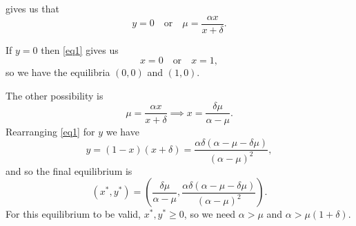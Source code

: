 \documentclass[a4paper, 12pt]{article}
\begin{document}
\begin{enumerate}[label={\bf \arabic{*}.\;}, ref={\arabic{*}},itemsep=3ex, left=0ex]
{\begin{enumerate}[label=(\alph*)]
           gives us that
          \begin{equation}
            y = 0 \quad \text{or} \quad \mu = \frac{\alpha x}{x + \delta}.
          \end{equation}

          If $y=0$ then \cref{eq1} gives us
          \begin{equation}
            x = 0 \quad \text{or} \quad x = 1,
          \end{equation}
          so we have the equilibria $(0,0)$ and $(1,0)$.

          The other possibility is
          \begin{equation}
            \mu = \frac{\alpha x}{x + \delta} \implies x = \frac{\delta \mu}{\alpha-\mu}.
            \label{poss2}
          \end{equation}
          Rearranging \cref{eq1} for $y$ we have
          \begin{equation}
            y = (1-x)(x+\delta) = \frac{\alpha\delta(\alpha - \mu - \delta \mu)}{(\alpha-\mu)^2},
          \end{equation}
          and so the final equilibrium is
          \begin{equation}
            (x^*,y^*) = \left( \frac{\delta\mu}{\alpha-\mu}, \frac{\alpha\delta(\alpha-\mu-\delta \mu)}{(\alpha-\mu)^2} \right).
          \end{equation}
          For this equilibrium to be valid, $x^*,y^*\geq0$, so we need $\alpha > \mu$ and $\alpha > \mu(1+\delta)$.


\end{enumerate}}
\end{enumerate}
\end{document}
